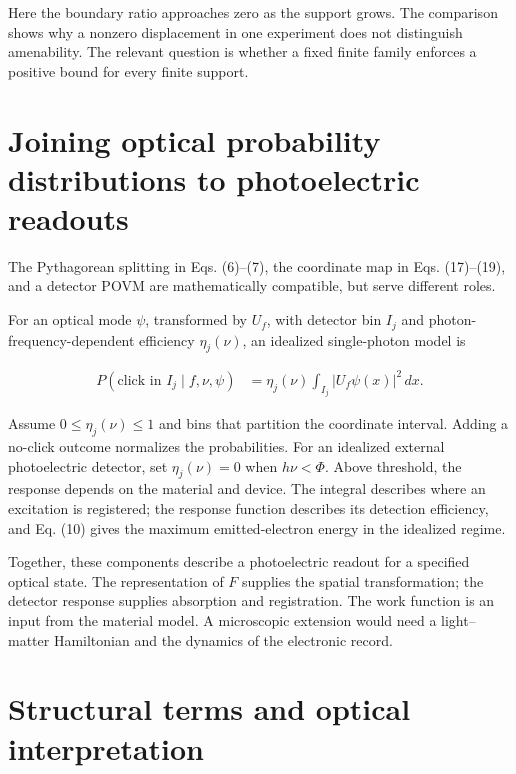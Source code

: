 \documentclass[11pt,a4paper]{article}
\begin{document}
Here the boundary ratio approaches zero as the support grows. The comparison shows why a nonzero displacement in one experiment does not distinguish amenability. The relevant question is whether a fixed finite family enforces a positive bound for every finite support.

\hypertarget{joining-optical-probability-distributions-to-photoelectric-readouts}{%
\section{Joining optical probability distributions to photoelectric readouts}\label{joining-optical-probability-distributions-to-photoelectric-readouts}}

The Pythagorean splitting in Eqs. (6)--(7), the coordinate map in Eqs. (17)--(19), and a detector POVM are mathematically compatible, but serve different roles.

For an optical mode \(\psi\), transformed by \(U_f\), with detector bin \(I_j\) and photon-frequency-dependent efficiency \(\eta_j(\nu)\), an idealized single-photon model is

\begin{equation}\label{eq:30}
\begin{aligned}
P(\text{click in }I_j\mid f,\nu,\psi)
&=\eta_j(\nu)\int_{I_j}|U_f\psi(x)|^2\,dx.
\end{aligned}
\end{equation}

Assume \(0\le\eta_j(\nu)\le1\) and bins that partition the coordinate interval. Adding a no-click outcome normalizes the probabilities. For an idealized external photoelectric detector, set \(\eta_j(\nu)=0\) when \(h\nu<\Phi\). Above threshold, the response depends on the material and device. The integral describes where an excitation is registered; the response function describes its detection efficiency, and Eq. (10) gives the maximum emitted-electron energy in the idealized regime.

Together, these components describe a photoelectric readout for a specified optical state. The representation of \(F\) supplies the spatial transformation; the detector response supplies absorption and registration. The work function is an input from the material model. A microscopic extension would need a light--matter Hamiltonian and the dynamics of the electronic record.

\hypertarget{structural-terms-and-optical-interpretation}{%
\section{Structural terms and optical interpretation}\label{structural-terms-and-optical-interpretation}}
\end{document}
